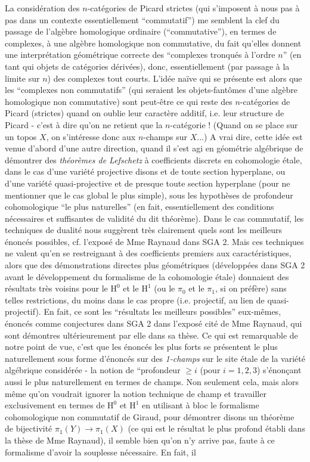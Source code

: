 \label{sec:app2}%
La considération des $n$-catégories de Picard strictes (qui s'imposent à nous pas à pas dans un contexte essentiellement ``commutatif'') me semblent la clef du passage de l'algèbre homologique ordinaire (``commutative''), en termes de complexes, à une algèbre homologique non commutative, du fait qu'elles donnent une interprétation géométrique correcte des ``complexes tronqués à l'ordre $n$'' (en tant qui objets de catégories dérivées), donc, essentiellement (par passage à la limite sur $n$) des complexes tout courts. L'idée naïve qui se présente est alors que les ``complexes non commutatifs'' (qui seraient les objets-fantômes d'une algèbre homologique non commutative) sont peut-être ce qui reste des $n$-catégories de Picard (strictes) quand on oublie leur caractère additif, i.e. leur structure de Picard - c'est à dire qu'on ne retient que la $n$-catégorie ! (Quand on se place sur un topos $X$, on s'intéresse donc aux $n$-champs sur $X$...) A vrai dire, cette idée est venue d'abord d'une autre direction, quand il s'est agi en géométrie algébrique de démontrer des \emph{théorèmes de Lefschetz} à coefficients discrets en cohomologie étale, dans le cas d'une variété projective disons et de toute section hyperplane, ou d'une variété quasi-projective et de presque toute section hyperplane (pour ne mentionner que le cas global le plus simple), sous les hypothèses de profondeur cohomologique ``le plus naturelles'' (en fait, essentiellement des conditions nécessaires et suffisantes de validité du dit théorème). Dans le cas commutatif, les techniques de dualité nous suggèrent très clairement quels sont les meilleurs énoncés possibles, cf. l'exposé de Mme Raynaud dans SGA 2. Mais ces techniques ne valent qu'en se restreignant à des coefficients premiers aux caractéristiques, alors que des démonstrations directes plus géométriques (développées dans SGA 2 avant le développement du formalisme de la cohomologie étale) donnaient des résultats très voisins pour le $\mathrm H^0$ et le $\mathrm H^1$ (ou le $\pi_0$ et le $\pi_1$, si on préfère) sans telles restrictions, du moins dans le cas propre (i.e. projectif, au lien de quasi-projectif). En fait, ce sont les ``résultats les meilleurs possibles'' eux-mêmes, énoncés comme conjectures dans SGA 2 dans l'exposé cité de Mme Raynaud, qui sont démontres ultérieurement par elle dans sa thèse. Ce qui est remarquable de notre point de vue, c'est que les énoncés les plus forts se présentent le plus naturellement sous forme d'énoncés sur des \emph{1-champs} sur le site étale de la variété algébrique considérée - la notion de ``profondeur $\geq i$ (pour $i = 1, 2, 3$) s'énon\c{c}ant aussi le plus naturellement en termes de champs. Non seulement cela, mais alors même qu'on voudrait ignorer la notion technique de champ et travailler exclusivement en termes de $\mathrm H^0$ et $\mathrm H^1$ en utilisant à bloc le formalisme cohomologique non commutatif de Giraud, pour démontrer disons un théorème de bijectivité $\pi_1(Y) \to \pi_1(X)$ (ce qui est le résultat le plus profond établi dans la thèse de Mme Raynaud), il semble bien qu'on n'y arrive pas, faute à ce formalisme d'avoir la souplesse nécessaire. En fait, il 